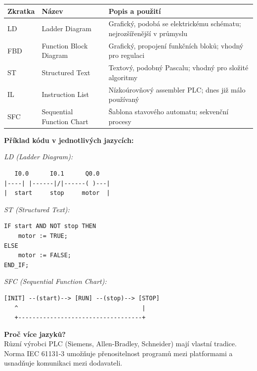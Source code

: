 \documentclass[a4paper,10pt]{article}
\begin{document}
\begin{vysvetlenibox}
\begin{center}
\begin{tabularx}{0.95\linewidth}{@{} l l X @{}}
    \toprule
    \textbf{Zkratka} & \textbf{Název} & \textbf{Popis a použití} \\
    \midrule
    LD  & Ladder Diagram & Grafický, podobá se elektrickému schématu;
                           nejrozšířenější v průmyslu \\
    FBD & Function Block Diagram & Grafický, propojení funkčních bloků;
                                   vhodný pro regulaci \\
    ST  & Structured Text & Textový, podobný Pascalu;
                            vhodný pro složité algoritmy \\
    IL  & Instruction List & Nízkoúrovňový assembler PLC;
                             dnes již málo používaný \\
    SFC & Sequential Function Chart & Šablona stavového automatu;
                                       sekvenční procesy \\
    \bottomrule
\end{tabularx}
\end{center}

\textbf{Příklad kódu v jednotlivých jazycích:}

\textit{LD (Ladder Diagram):}
\begin{verbatim}
   I0.0      I0.1      Q0.0
|----| |------|/|------( )---|
|  start     stop     motor  |
\end{verbatim}

\textit{ST (Structured Text):}
\begin{verbatim}
IF start AND NOT stop THEN
    motor := TRUE;
ELSE
    motor := FALSE;
END_IF;
\end{verbatim}

\textit{SFC (Sequential Function Chart):}
\begin{verbatim}
[INIT] --(start)--> [RUN] --(stop)--> [STOP]
   ^                                   |
   +-----------------------------------+
\end{verbatim}

\textbf{Proč více jazyků?}\\
Různí výrobci PLC (Siemens, Allen-Bradley, Schneider) mají vlastní tradice.
Norma IEC 61131-3 umožňuje přenositelnost programů mezi platformami a usnadňuje
komunikaci mezi dodavateli.
\end{vysvetlenibox}

\end{document}
